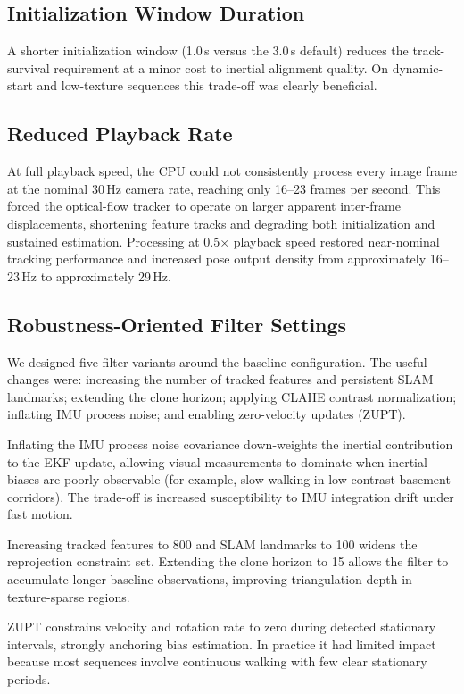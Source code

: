 \documentclass[journal]{IEEEtran}
\begin{document}
\subsection{Initialization Window Duration}

A shorter initialization window (1.0\,s versus the 3.0\,s default) reduces
the track-survival requirement at a minor cost to inertial alignment quality.
On dynamic-start and low-texture sequences this trade-off was clearly
beneficial.

\subsection{Reduced Playback Rate}

At full playback speed, the CPU could not consistently process every image
frame at the nominal 30\,Hz camera rate, reaching only 16--23 frames per
second.
This forced the optical-flow tracker to operate on larger apparent
inter-frame displacements, shortening feature tracks and degrading both
initialization and sustained estimation.
Processing at 0.5$\times$ playback speed restored near-nominal tracking
performance and increased pose output density from approximately 16--23\,Hz
to approximately 29\,Hz.

\subsection{Robustness-Oriented Filter Settings}

We designed five filter variants around the baseline configuration.
The useful changes were: increasing the number of tracked features and
persistent SLAM landmarks; extending the clone horizon; applying CLAHE
contrast normalization; inflating IMU process noise; and enabling
zero-velocity updates (ZUPT).

Inflating the IMU process noise covariance down-weights the inertial
contribution to the EKF update, allowing visual measurements to dominate
when inertial biases are poorly observable (for example, slow walking in
low-contrast basement corridors).
The trade-off is increased susceptibility to IMU integration drift under
fast motion.

Increasing tracked features to 800 and SLAM landmarks to 100 widens the
reprojection constraint set.
Extending the clone horizon to 15 allows the filter to accumulate longer-baseline
observations, improving triangulation depth in texture-sparse regions.

ZUPT constrains velocity and rotation rate to zero during detected stationary
intervals, strongly anchoring bias estimation.
In practice it had limited impact because most sequences involve continuous
walking with few clear stationary periods.
\end{document}
